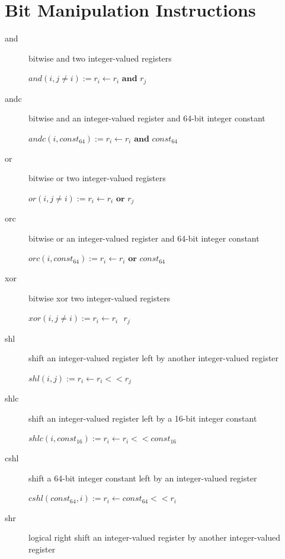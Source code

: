 \documentclass[english,a4paper,12pt]{report}
\begin{document}
\section{Bit Manipulation Instructions}
\begin{description}
	\item[and] bitwise and two integer-valued registers
	
	$and(i, j\neq i) := r _{i} \longleftarrow  r _{i}  \textbf{ and } 
	r _{j} $ \\
	\item[andc] bitwise and an integer-valued register and 64-bit 
	integer
	constant
	
	$andc(i, const _{64}) :=  r _{i} \longleftarrow  r _{i} \textbf{ 
	and } const _{64} $ \\
	\item[or] bitwise or two integer-valued registers
	
	$or(i, j \neq i) := r _{i} \longleftarrow  r _{i} \textbf{ or } r 
	_{j} $  \\
	\item[orc] bitwise or an integer-valued register and 64-bit 
	integer
	constant
	
	$orc(i, const _{64}) :=  r _{i} \longleftarrow  r _{i} \textbf{ 
	or } const _{64} $ \\
	\item[xor] bitwise xor two integer-valued registers
	
	$xor(i, j \neq i) := r _{i} \longleftarrow  r _{i} \textbf{ \^{} 
	} r _{j} $ \\
	\item[shl] shift an integer-valued register left by another
	integer-valued register
	
	$shl(i, j) := r _{i} \longleftarrow  r _{i} << r _{j} $ \\
	\item[shlc] shift an integer-valued register left by a 16-bit 
	integer
	constant
	
	$shlc(i, const _{16}) :=  r _{i} \longleftarrow  r _{i} << const 
	_{16} $ \\
  \item[cshl] shift a 64-bit integer constant left by an
    integer-valued register
	
	$cshl(const _{64}, i):=  r _{i} \longleftarrow  const _{64} << r 
	_{i}  $ \\
	\item[shr] logical right shift an integer-valued register by 
	another integer-valued register
	

\end{description}
\end{document}

